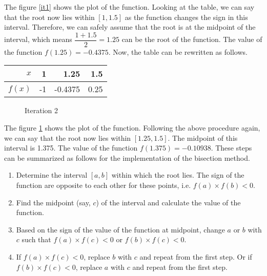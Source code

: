 \documentclass[]{book}
\begin{document}
The figure \ref{it1} shows the plot of the function.
Looking at the table, we can say that the root now lies within $[1,1.5]$ as the function changes the sign in this interval. Therefore, we can safely assume that the root is at the midpoint of the interval, which means $\dfrac{1+1.5}{2}=1.25$ can be the root of the function. The value of the function $f(1.25) = -0.4375$. Now, the table can be rewritten as follows.
\begin{center}
\begin{tabular}{|r|r|r|r|}
\hline
$x$ & 1 & 1.25 & 1.5\\
\hline
$f(x)$ & -1 & -0.4375 & 0.25\\
\hline
\end{tabular}
\end{center}
\begin{figure}
\begin{center}
\end{center}
\caption{Iteration 2}
\label{it2}
\end{figure}
The figure \ref{it2} shows the plot of the function. Following the above procedure again, we can say that the root now lies within $[1.25,1.5]$. The midpoint of this interval is 1.375. The value of the function $f(1.375) = -0.10938$. These steps can be summarized as follows for the implementation of the bisection method.
\begin{enumerate}
\item Determine the interval $[a,b]$ within which the root lies. The sign of the function are opposite to each other for these points, i.e. $f(a)\times f(b)<0$. 
\item Find the midpoint (say, $c$) of the interval and calculate the value of the function.
\item Based on the sign of the value of the function at midpoint, change $a$ or $b$ with $c$ such that $f(a)\times f(c)<0$ or $f(b)\times f(c)<0$.
\item If $f(a)\times f(c)<0$, replace $b$ with $c$ and repeat from the first step. Or if $f(b)\times f(c)<0$, replace $a$ with $c$ and repeat from the first step.
\end{enumerate}
\end{document}
